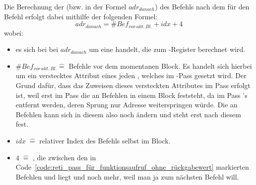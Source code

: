 \begin{Special_Paragraph}
  Die Berechnung der   (bzw. in der Formel $adr_{danach}$) des Befehls nach dem   für den Befehl  erfolgt dabei mithilfe der folgenden Formel:
\begin{equation}
  adr_{danach} = \#Bef_{vor\,akt.\,Bl.} + idx + 4
  \label{eq:addr_next_instr}
\end{equation}
  wobei:
  \begin{itemize}
    \item es sich bei bei $adr_{danach}$ um eine  handelt, die  zum -Register berechnet wird.
    \item $\#Bef_{vor\,akt.\,Bl.} \hat=$  Befehle vor dem momentanen Block. Es handelt sich hierbei um ein \textcolor{gray!90!black}{verstecktes Attribut}  eines jeden  , welches im -Pass gesetzt wird. Der Grund dafür, dass das Zuweisen dieses \textcolor{gray!90!black}{versteckten Attributes}  im  Pass erfolgt ist, weil erst im  Pass die  an Befehlen in einem Block feststeht, da im  Pass 's entfernt werden, deren Sprung nur  Adresse weiterspringen würde. Die  an Befehlen kann sich in diesem  also noch ändern und steht erst nach diesem  fest.
    \item $idx\; \hat=$ relativer Index des Befehls  selbst im Block.
    \item $4\; \hat=$ , die zwischen den in Code~\ref{code:reti_pass_für_funktionsaufruf_ohne_rückgabewert} markierten Befehlen  und  liegt und noch  mehr, weil man ja zum nächsten Befehl will.
  \end{itemize}


\end{Special_Paragraph}
